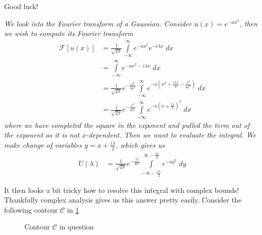 \documentclass[10pt]{article}
\begin{document}
Good luck!

{\em \small We look into the Fourier transform of a Gaussian. Consider $u(x) = e^{-ax^2}$, then we wish to compute its Fourier transform
\begin{align}
    \mathcal{F}[u(x)] &= \frac{1}{\sqrt{2\pi}}\int\limits_{-\infty}^{\infty}e^{-ax^2}e^{-i\lambda x}\;dx\\
    &= \int\limits_{-\infty}^{\infty}e^{-ax^2 - i\lambda x}\;dx\\
    &= \frac{1}{\sqrt{2\pi}}e^{-\frac{\lambda^2}{4a^2}}\int\limits_{-\infty}^{\infty}e^{-a\left(x^2 + \frac{i\lambda x}{a} - \frac{\lambda^2}{4a^2}\right)}\;dx\\
    &= \frac{1}{\sqrt{2\pi}}e^{-\frac{\lambda^2}{4a^2}}\int\limits_{-\infty}^{\infty}e^{-a\left(x + \frac{i\lambda}{2}\right)^2}\;dx
\end{align}
where we have completed the square in the exponent and pulled the term out of the exponent as it is not $x$-dependent. Then we want to evaluate the integral. We make change of variables $y = x + \frac{i\lambda}{2}$, which gives us
\begin{align}
    U(\lambda) &= \frac{1}{\sqrt{2\pi}}e^{-\frac{\lambda^2}{4a^2}}\int\limits_{-\infty - \frac{i\lambda}{2}}^{\infty - \frac{i\lambda}{2}}e^{-ay^2}\;dy
\end{align}

It then looks a bit tricky how to resolve this integral with complex bounds! Thankfully complex analysis gives us this answer pretty easily. Consider the following contour $\mathcal{C}$ in \ref{Contour}
\begin{figure}[!h]
    \centering
    \caption{Contour $\mathcal{C}$ in question}
    \label{Contour}
\end{figure}

}
\end{document}
